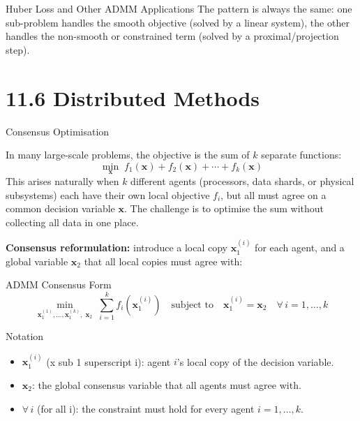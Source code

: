 \documentclass[aspectratio=169,10pt]{beamer}
\newcommand{\bx}{\mathbf{x}}
\begin{document}
\begin{frame}[allowframebreaks]{Huber Loss and Other ADMM Applications}
  The pattern is always the same: one sub-problem handles the smooth
  objective (solved by a linear system), the other handles the
  non-smooth or constrained term (solved by a proximal/projection step).

\end{frame}

\section{11.6 Distributed Methods}

\begin{frame}[allowframebreaks]{Consensus Optimisation}

  In many large-scale problems, the objective is the sum of $k$ separate
  functions:
  \[
    \min_{\bx}\; f_1(\bx) + f_2(\bx) + \cdots + f_k(\bx)
  \]
  This arises naturally when $k$ different agents (processors, data shards,
  or physical subsystems) each have their own local objective $f_i$, but
  all must agree on a common decision variable $\bx$.  The challenge is to
  optimise the sum without collecting all data in one place.

  \medskip
  \textbf{Consensus reformulation:} introduce a local copy
  $\bx_1^{(i)}$ for each agent, and a global variable $\bx_2$ that all
  local copies must agree with:

  \begin{block}{ADMM Consensus Form}
    \[
      \min_{\bx_1^{(1)}, \ldots, \bx_1^{(k)},\; \bx_2}\;
      \sum_{i=1}^k f_i\!\left(\bx_1^{(i)}\right)
      \quad \text{subject to} \quad
      \bx_1^{(i)} = \bx_2 \quad \forall\, i = 1, \ldots, k
    \]
  \end{block}

  \begin{block}{Notation}
    \begin{itemize}
      \item $\bx_1^{(i)}$ (x sub 1 superscript i): agent $i$'s local copy
            of the decision variable.
      \item $\bx_2$: the global consensus variable that all agents must
            agree with.
      \item $\forall\, i$ (for all i): the constraint must hold for every
            agent $i = 1, \ldots, k$.
    \end{itemize}
  \end{block}


\end{frame}
\end{document}
